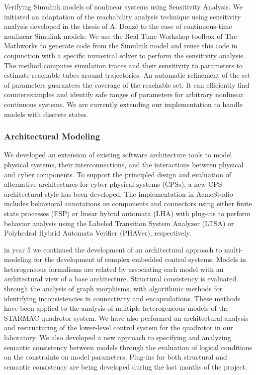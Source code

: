 Verifying Simulink models of nonlinear systems using Sensitivity Analysis. We
initiated an adaptation of the reachability analysis technique using sensitivity analysis developed
in the thesis of A. Donzé to the case of continuous-time nonlinear Simulink models. We use the
Real Time Workshop toolbox of The Mathworks to generate code from the Simulink model and
reuse this code in conjunction with a specific numerical solver to perform the sensitivity analysis.
The method computes simulation traces and their sensitivity to parameters to estimate reachable
tubes around trajectories. An automatic refinement of the set of parameters guarantees the
coverage of the reachable set. It can efficiently find counterexamples and identify safe ranges of
parameters for arbitrary nonlinear continuous systems. We are currently extending our implementation
to handle models with discrete states.

\subsubsection{Architectural Modeling}

We developed an extension of existing software architecture tools to model physical systems, their interconnections, and the interactions between physical and cyber components. To support the principled design and evaluation of alternative architectures for cyber-physical systems (CPSs), a new CPS architectural style has been developed.  The implementation in AcmeStudio includes behavioral annotations on components and connectors using either finite state processes (FSP) or linear hybrid automata (LHA) with plug-ins to perform behavior analysis using the Labeled Transition System Analyzer (LTSA) or Polyhedral Hybrid Automata Verifier (PHAVer), respectively.   

in year 5 we continued the development of an architectural approach to multi-modeling for the development of complex embedded control systems.   Models in heterogeneous formalisms are related by associating each model with an architectural view of a base architecture.  Structural consistency is evaluated through the analysis of graph morphisms, with algorithmic methods for identifying inconsistencies in connectivity and encapsulations.  These methods have been applied to the analysis of multiple heterogeneous models of the STARMAC quadrotor system.  We have also performed an architectural analysis and restructuring of the lower-level control system for the quadrotor in our laboratory.    We also developed a new approach to specifying and analyzing semantic consistency between models through the evaluation of logical conditions on the constraints on model parameters.  Plug-ins for both structural and semantic consistency are being developed during the last months of the project.

